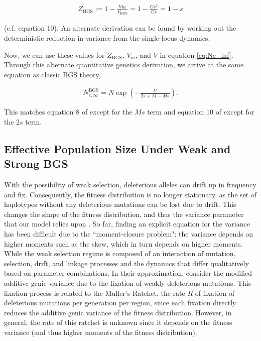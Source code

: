\documentclass[11pt]{article}
\begin{document}
\begin{align}
  Z_\text{BGS} := 1 - \frac{Vm}{V_\text{BGS}} = 1 - \frac{Us^2}{Us} = 1 - s
\end{align}

(c.f. \cite{Santiago1998-bs} equation 10). An alternate derivation can be found
by working out the deterministic reduction in variance from the single-locus
dynamics. 

Now, we can use these values for $Z_\text{BGS}$, $V_m$, and $V$ in equation
\eqref{eq:Ne_inf}. Through this alternate quantitative genetics derivation, we
arrive at the same equation as classic BGS theory,

\begin{align}
  N_{e,\infty}^\text{BGS} = N \exp\left( - \frac{U}{2s + M - Ms} \right).
\end{align}

This matches equation 8 of \textcite{Hudson1995-xc} except for the $Ms$ term
and equation 10 of \textcite{Nordborg1996-nq} except for the $2s$ term.

\subsection*{Effective Population Size Under Weak and Strong BGS}

With the possibility of weak selection, deleterious alleles can drift up in
frequency and fix. Consequently, the fitness distribution is no longer
stationary, as the set of haplotypes without any deleterious mutations can be
lost due to drift. This changes the shape of the fitness distribution, and thus
the variance parameter that our model relies upon
\parencite{Gessler1995-hz,OFallon2010-my,Good2013-lp,Haigh1978-gt,Higgs1995-xc}.
So far, finding an explicit equation for the variance has been difficult due to
the ``moment-closure problem": the variance depends on higher moments such as
the skew, which in turn depends on higher moments. While the weak selection
regime is composed of an interaction of mutation, selection, drift, and linkage
processes and the dynamics that differ qualitatively based on parameter
combinations. In their approximation, \textcite{Santiago2016-mu} consider the
modified additive genic variance due to the fixation of weakly deleterious
mutations. This fixation process is related to the Muller's Ratchet, the rate
$R$ of fixation of deleterious mutations per generation per region, since each
fixation directly reduces the additive genic variance of the fitness
distribution. However, in general, the rate of this ratchet is unknown since it
depends on the fitness variance (and thus higher moments of the fitness
distribution).
\end{document}
